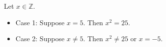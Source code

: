 Let $x \in \mathbb{Z}$.

\begin{itemize}
  \item Case 1: Suppose $x = 5$.
    Then $x^{2} = 25$.
  \item Case 2: Suppose $x \neq 5$.
    Then $x^{2} \neq 25$ or $x = -5$.
\end{itemize}